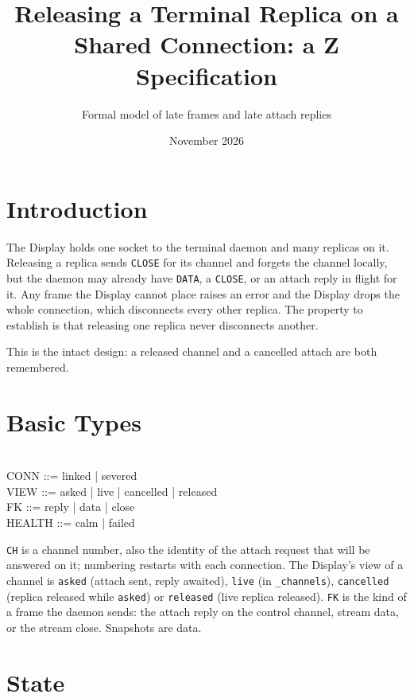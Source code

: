 \documentclass[a4paper,10pt,fleqn]{article}
\begin{document}
\title{Releasing a Terminal Replica on a Shared Connection: a Z Specification}
\author{Formal model of late frames and late attach replies}
\date{November 2026}
\maketitle

\section{Introduction}

The Display holds one socket to the terminal daemon and many replicas on it.
Releasing a replica sends \texttt{CLOSE} for its channel and forgets the
channel locally, but the daemon may already have \texttt{DATA}, a
\texttt{CLOSE}, or an attach reply in flight for it.  Any frame the Display
cannot place raises an error and the Display drops the whole connection, which
disconnects every other replica.  The property to establish is that releasing
one replica never disconnects another.

This is the intact design: a released channel and a cancelled attach are both remembered.

\section{Basic Types}

\begin{zed}
  [CH] \\
  CONN ::= linked | severed \\
  VIEW ::= asked | live | cancelled | released \\
  FK ::= reply | data | close \\
  HEALTH ::= calm | failed
\end{zed}

\texttt{CH} is a channel number, also the identity of the attach request that
will be answered on it; numbering restarts with each connection.  The
Display's view of a channel is \texttt{asked} (attach sent, reply awaited),
\texttt{live} (in \texttt{\_channels}), \texttt{cancelled} (replica released
while \texttt{asked}) or \texttt{released} (live replica released).
\texttt{FK} is the kind of a frame the daemon sends: the attach reply on the
control channel, stream data, or the stream close.  Snapshots are data.

\section{State}
\end{document}
